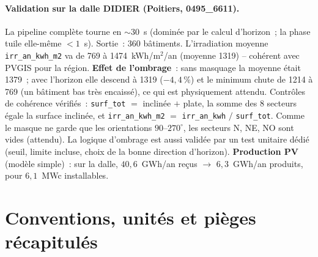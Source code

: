 \documentclass[11pt,a4paper]{article}
\newcommand{\fonction}[1]{\texttt{#1}}
\begin{document}
\paragraph{Validation sur la dalle DIDIER (Poitiers, 0495\_6611).} La pipeline
complète tourne en $\sim 30$~s (dominée par le calcul d'horizon~; la phase tuile
elle-même $< 1$~s). Sortie~: 360 bâtiments. L'irradiation moyenne
\fonction{irr\_an\_kwh\_m2} va de 769 à 1474~kWh/m$^2$/an (moyenne 1319) --
cohérent avec PVGIS pour la région. \textbf{Effet de l'ombrage}~: sans masquage
la moyenne était 1379~; avec l'horizon elle descend à 1319 ($-4{,}4\,\%$) et le
minimum chute de 1214 à 769 (un bâtiment bas très encaissé), ce qui est
physiquement attendu. Contrôles de cohérence vérifiés~: \fonction{surf\_tot} $=$
inclinée $+$ plate, la somme des 8 secteurs égale la surface inclinée, et
\fonction{irr\_an\_kwh\_m2} $=$ \fonction{irr\_an\_kwh} $/$ \fonction{surf\_tot}.
Comme le masque ne garde que les orientations $90$--$270^\circ$, les secteurs N,
NE, NO sont vides (attendu). La logique d'ombrage est aussi validée par un test
unitaire dédié (seuil, limite incluse, choix de la bonne direction d'horizon).
\textbf{Production PV} (modèle simple)~: sur la dalle, $40{,}6$~GWh/an reçus
$\rightarrow$ $6{,}3$~GWh/an produits, pour $6{,}1$~MWc installables.

\section{Conventions, unités et pièges récapitulés}
\end{document}
